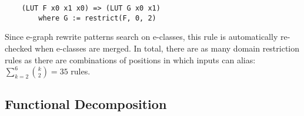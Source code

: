 \begin{verbatim}
    (LUT F x0 x1 x0) => (LUT G x0 x1)
        where G := restrict(F, 0, 2)
\end{verbatim}

Since e-graph rewrite patterns search on e-classes, this rule is automatically
re-checked when e-classes are merged. In total, there are as many domain
restriction rules as there are combinations of positions in which inputs can
alias: $\sum_{k=2}^{6} \binom{k}{2} = 35$ rules.

\subsection{Functional Decomposition}\label{sec:rewrites:decomp}
